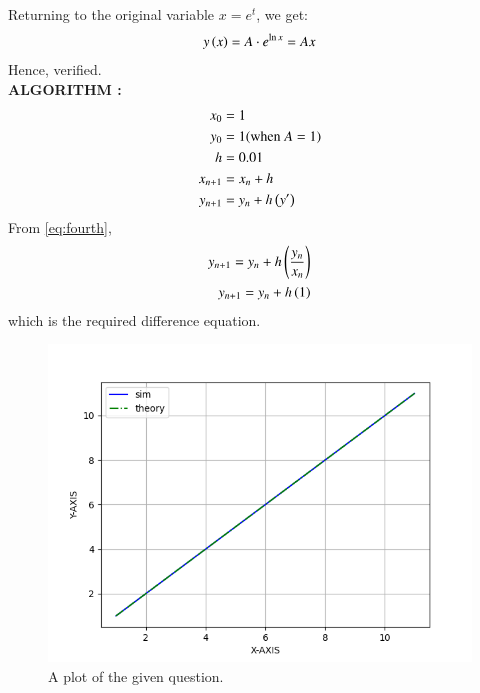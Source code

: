 \documentclass[journal]{IEEEtran}
\begin{document}
Returning to the original variable $x=e^{t}$, we get:
\begin{align}
    y\left(x\right)=A\cdot e^{\ln{x}}=Ax
\end{align}
Hence, verified. \\
\newline 
\textbf{ALGORITHM :} \\
\begin{align}
	 x_0 &= 1 \\
	 y_0 &= 1 \text{(when $A=1$)}   \\
	 h &= 0.01 \\
	 x_{n+1} &= x_{n} + h \\
	 y_{n+1} &= y_{n} + h \left(y^{\prime}\right) 
\end{align}
From \eqref{eq:fourth}, 
\begin{align}
	y_{n+1} = y_{n} + h \left(\frac{y_{n}}{x_{n}}\right) \\
	y_{n+1} = y_{n} + h \left(1\right)
\end{align}
which is the required difference equation.

\begin{figure}[h]
				 \centering
				 \includegraphics[width=\columnwidth]{figs/fig.png}
				 \caption{A plot of the given question.}
				 \label{fig:Plot1}
			 \end{figure}
\end{document}
